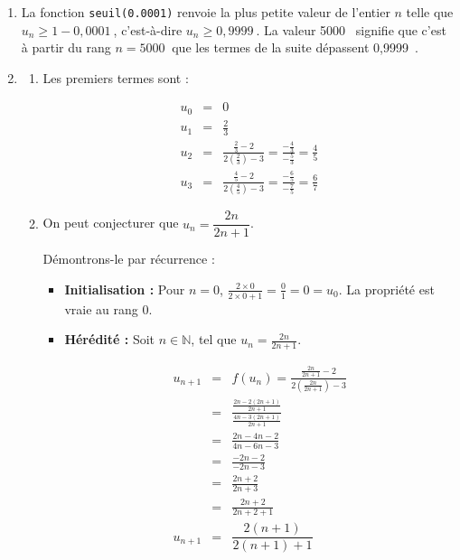 \documentclass[10pt]{article}
\providecommand{\N}{\mathbb{N}}
\providecommand{\np}[2][]{{#2~#1}}
\begin{document}
\begin{enumerate}
\[\begin{array}{rcl}
\dfrac{x - 2}{2x - 3} = x &\iff& x - 2 = x(2x - 3) \\
&\iff& x - 2 = 2x^2 - 3x \\
&\iff& 2x^2 - 4x + 2 = 0 \\
&\iff& 2(x - 1)^2 = 0 \\
&\iff& (x - 1)^2 = 0\\
&\iff& (x - 1) = 0\\
&\iff& x  = 1\\
\end{array}\]

On en déduit que $\ell = 1$ et donc que la suite $(u_n)$ converge vers 1.
\item La fonction \texttt{seuil(0.0001)} renvoie la plus petite valeur de l'entier $n$ telle que $u_n \geqslant 1 - \np{0,0001}$, c'est-à-dire $u_n \geqslant \np{0,9999}$. La valeur \np{5000} signifie que c'est à partir du rang $n = \np{5000}$ que les termes de la suite dépassent \np{0,9999}.

\item
\begin{enumerate}
\item Les premiers termes sont :

\[\begin{array}{rcl}
u_0 &=& 0 \\
u_1 &=& \frac{2}{3} \\
u_2 &=& \frac{\frac{2}{3} - 2}{2\left(\frac{2}{3}\right) - 3} = \frac{-\frac{4}{3}}{-\frac{5}{3}} = \frac{4}{5} \\
u_3 &=& \frac{\frac{4}{5} - 2}{2\left(\frac{4}{5}\right) - 3} = \frac{-\frac{6}{5}}{-\frac{7}{5}} = \frac{6}{7}
\end{array}\]

\item On peut conjecturer que $u_n = \dfrac{2n}{2n + 1}$.

Démontrons-le par récurrence :

\begin{itemize}
\item \textbf{Initialisation :} Pour $n = 0$, $\frac{2 \times 0}{2 \times0 + 1} = \frac01 = 0 = u_0$. La propriété est vraie au rang 0.
\item \textbf{Hérédité :} Soit $n \in \N$, tel que $u_n = \frac{2n}{2n + 1}$.

\[\begin{array}{rcl}
u_{n+1} &=& f(u_n) = \frac{\frac{2n}{2n+1} - 2}{2\left(\frac{2n}{2n+1}\right) - 3} \\
&=& \frac{\frac{2n - 2(2n+1)}{2n+1}}{\frac{4n - 3(2n+1)}{2n+1}} \\
&=& \frac{2n - 4n - 2}{4n - 6n - 3} \\
&=& \frac{-2n- 2}{-2n - 3} \\&=& \frac{2n+2}{2n+3}\\
&=& \frac{2n+2}{2n+2 + 1}\\
u_{n+1} &=&\dfrac{2(n+1)}{2(n+1) + 1}\\
\end{array}\]


\end{itemize}
\end{enumerate}
\end{enumerate}
\end{document}
